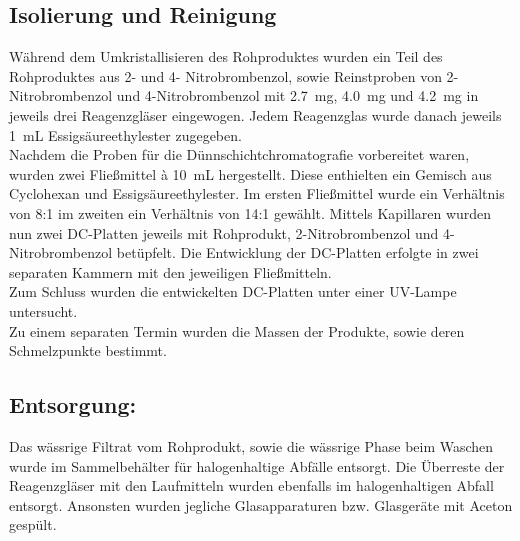 \subsection*{Isolierung und Reinigung}
Während dem Umkristallisieren des Rohproduktes wurden ein Teil des Rohproduktes aus 2- und 4- Nitrobrombenzol, sowie Reinstproben von 2-Nitrobrombenzol und 4-Nitrobrombenzol mit \SI{2,7}{\milli \gram}, \SI{4,0}{\milli \gram} und \SI{4,2}{\milli \gram} in jeweils drei Reagenzgläser eingewogen. Jedem Reagenzglas wurde danach jeweils \SI{1}{\milli \liter} Essigsäureethylester zugegeben.\\
Nachdem die Proben für die Dünnschichtchromatografie vorbereitet waren, wurden zwei Fließmittel à \SI{10}{\milli \liter} hergestellt. Diese enthielten ein Gemisch aus Cyclohexan und Essigsäureethylester. Im ersten Fließmittel wurde ein Verhältnis von 8:1 im zweiten ein Verhältnis von 14:1 gewählt. Mittels Kapillaren wurden nun zwei DC-Platten jeweils mit Rohprodukt, 2-Nitrobrombenzol und 4-Nitrobrombenzol betüpfelt. Die Entwicklung der DC-Platten erfolgte in zwei separaten Kammern mit den jeweiligen Fließmitteln. \\
Zum Schluss wurden die entwickelten DC-Platten unter einer UV-Lampe untersucht.\\
Zu einem separaten Termin wurden die Massen der Produkte, sowie deren Schmelzpunkte bestimmt.

\subsection*{Entsorgung:}
Das wässrige Filtrat vom Rohprodukt, sowie die wässrige Phase beim Waschen wurde im Sammelbehälter für halogenhaltige Abfälle entsorgt. Die Überreste der Reagenzgläser mit den Laufmitteln wurden ebenfalls im halogenhaltigen Abfall entsorgt. Ansonsten wurden jegliche Glasapparaturen bzw. Glasgeräte mit Aceton gespült.

\newpage